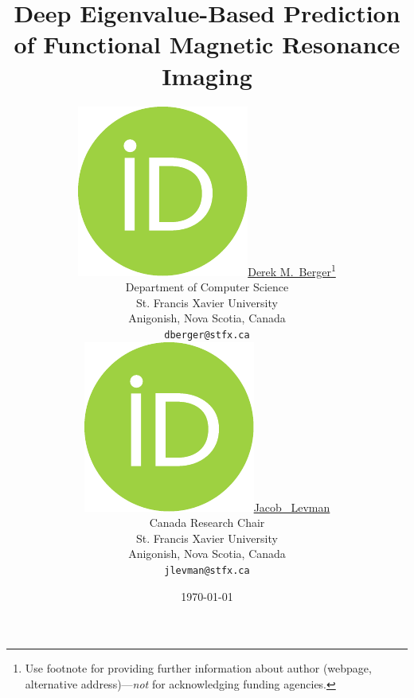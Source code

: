 \title{Deep Eigenvalue-Based Prediction of Functional Magnetic Resonance Imaging}
\date{\today}
\author{ \href{https://orcid.org/0000-0003-4733-0624}{\includegraphics[scale=0.06]{orcid.pdf}\hspace{1mm}Derek M.~Berger}\thanks{Use footnote for providing further
    information about author (webpage, alternative
    address)---\emph{not} for acknowledging funding agencies.} \\
  Department of Computer Science\\
  St. Francis Xavier University\\
  Anigonish, Nova Scotia, Canada \\
  \texttt{dberger@stfx.ca} \\
  \And
  \href{https://orcid.org/0000-0002-9604-3157}{\includegraphics[scale=0.06]{orcid.pdf}\hspace{1mm}Jacob ~Levman} \\
  Canada Research Chair\\
  St. Francis Xavier University\\
  Anigonish, Nova Scotia, Canada \\
  \texttt{jlevman@stfx.ca} \\
}